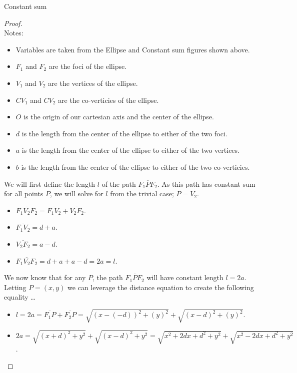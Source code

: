 \documentclass[12pt]{article}
\newcommand{\ds}{\displaystyle}
\theoremstyle{plain}
\begin{document}
\begin{center}
  Constant sum
\end{center}

\begin{proof}
  \ \\

  Notes:
  \begin{itemize}
    \item Variables are taken from the Ellipse and Constant sum figures shown above.
    \item $ F_{1} $ and $ F_{2} $ are the foci of the ellipse.
    \item $ V_{1} $ and $ V_{2} $ are the vertices of the ellipse.
    \item $ CV_{1} $ and $ CV_{2} $ are the co-verticies of the ellipse.
    \item $ O $ is the origin of our cartesian axis and the center of the ellipse.
    \item $ d $ is the length from the center of the ellipse to either of the two foci.
    \item $ a $ is the length from the center of the ellipse to either of the two vertices.
    \item $ b $ is the length from the center of the ellipse to either of the two co-verticies.
  \end{itemize}

  We will first define the length $ l $ of the path $ \overline{F_{1}PF_{2}} $.
  As this path has constant sum for all points $ P $, we will solve for $ l $ from the trivial case; $ P = V_{2} $.
  \begin{itemize}
    \item $ \overline{F_{1}V_{2}F_{2}} = \overline{F_{1}V_{2}} + \overline{V_{2}F_{2}} $.
    \item $ \overline{F_{1}V_{2}} = d + a $.
    \item $ \overline{V_{2}F_{2}} = a - d $.
    \item $ \overline{F_{1}V_{2}F_{2}} = d + a + a - d = 2a = l $.
  \end{itemize}

  We now know that for any $ P $, the path $ \overline{F_{1}PF_{2}} $ will have constant length $ l = 2a $.
  Letting $ P = (x,y) $ we can leverage the distance equation to create the following equality \dots

  \begin{itemize}
    \item $ \ds l = 2a = \overline{F_{1}P} + \overline{F_{2}P} = \sqrt{(x - (-d))^{2} + (y)^{2}} + \sqrt{(x - d)^{2} + (y)^{2}} $.
    \item $ \ds 2a = \sqrt{(x + d)^{2} + y^{2}} + \sqrt{(x - d)^{2} + y^{2}} = \sqrt{x^{2} + 2dx + d^{2} + y^{2}} + \sqrt{x^{2} - 2dx + d^{2} + y^{2}} $.
  \end{itemize}


\end{proof}
\end{document}
